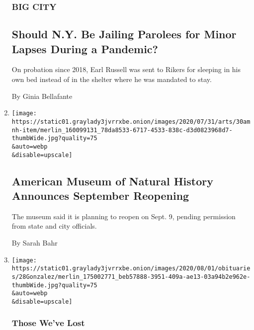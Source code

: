 \begin{enumerate}
  \hypertarget{big-city}{%
  \subsubsection{BIG CITY}\label{big-city}}

  \hypertarget{should-ny-be-jailing-parolees-for-minor-lapses-during-a-pandemic}{%
  \subsection{Should N.Y. Be Jailing Parolees for Minor Lapses During a
  Pandemic?}\label{should-ny-be-jailing-parolees-for-minor-lapses-during-a-pandemic}}

  On probation since 2018, Earl Russell was sent to Rikers for sleeping
  in his own bed instead of in the shelter where he was mandated to
  stay.

  By Ginia Bellafante
\item
  \href{/2020/07/30/arts/design/american-museum-of-natural-history-reopen-covid.html}{}

  \texttt{[image: https://static01.graylady3jvrrxbe.onion/images/2020/07/31/arts/30amnh-item/merlin\_160099131\_78da8533-6717-4533-838c-d3d0823968d7-thumbWide.jpg?quality=75\\\&auto=webp\\\&disable=upscale]}

  \hypertarget{american-museum-of-natural-history-announces-september-reopening}{%
  \subsection{American Museum of Natural History Announces September
  Reopening}\label{american-museum-of-natural-history-announces-september-reopening}}

  The museum said it is planning to reopen on Sept. 9, pending
  permission from state and city officials.

  By Sarah Bahr
\item
  \href{/2020/07/30/obituaries/waldemar-gonzalez-dead-coronavirus.html}{}

  \texttt{[image: https://static01.graylady3jvrrxbe.onion/images/2020/08/01/obituaries/28Gonzalez/merlin\_175002771\_beb57888-3951-409a-ae13-03a94b2e962e-thumbWide.jpg?quality=75\\\&auto=webp\\\&disable=upscale]}

  \hypertarget{those-weve-lost}{%
  \subsubsection{Those We've Lost}\label{those-weve-lost}}


\end{enumerate}
